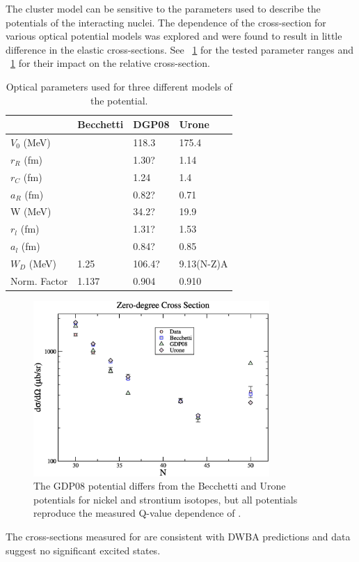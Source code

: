 The cluster model can be sensitive to the parameters used to describe the potentials of the interacting nuclei.  The dependence of the cross-section for various  optical potential models was explored and were found to result in little difference in the elastic cross-sections.  See {\tab}~\ref{tab:parameterSensitivity} for the tested parameter ranges and {\fig}~\ref{fig:parameterSensitivity} for their impact on the relative cross-section.
\begin{table}[htp]
\centering
\begin{tabular}{llll}
 & Becchetti & DGP08 & Urone \\
\hline
$V_0$ (MeV) & & 118.3 & 175.4 \\
$r_R$ (fm) & & 1.30? & 1.14 \\
$r_C$ (fm) & & 1.24 & 1.4 \\
$a_R$ (fm) & & 0.82? & 0.71 \\
W (MeV) & & 34.2? & 19.9 \\
$r_l$ (fm) & & 1.31? & 1.53 \\
$a_l$ (fm) & & 0.84? & 0.85 \\
$W_D$ (MeV) & 1.25 & 106.4? & 9.13(N-Z)A \\
Norm. Factor & 1.137 & 0.904 & 0.910 \\
\end{tabular}
\caption{Optical parameters used for three different models of the  potential.}
\label{tab:parameterSensitivity}
\end{table}

\begin{figure}[!htbp]
\centering
\includegraphics[width=0.8\textwidth]{figures/CrossSectionVsN_ElasticSurvey.eps}
\caption{The GDP08 potential differs from the Becchetti and Urone potentials for nickel and strontium isotopes, but all potentials reproduce the measured Q-value dependence of \GeTargets.}
\label{fig:parameterSensitivity}
\end{figure}

The cross-sections measured for \reaction are consistent with DWBA predictions and data suggest no significant excited \zp states.
%
% 
% 
